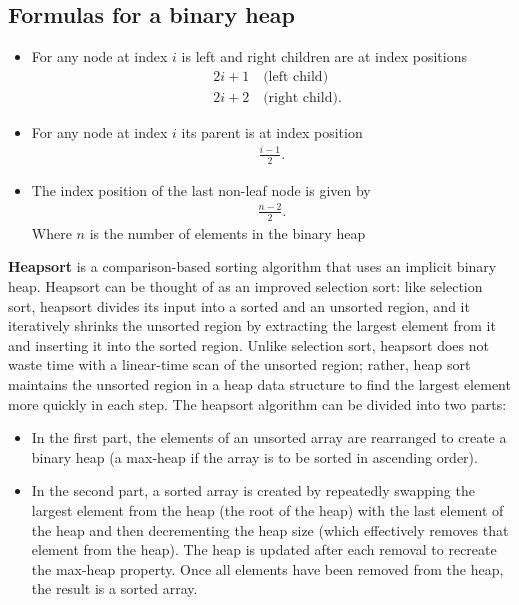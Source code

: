 \documentclass{report}
\begin{document}
    \subsection{Formulas for a binary heap}
    \begin{itemize}
        \item For any node at index $i$ is left and right children are at index positions
            \begin{align*}
                &2i + 1 \quad \text{(left child)} \\
                &2i+2 \quad \text{(right child)}
            .\end{align*}
        \item For any node at index $i$ its parent is at index position
            \begin{align*}
                \frac{i-1}{2}
            .\end{align*}
        \item The index position of the last non-leaf node is given by 
            \begin{align*}
                \frac{n-2}{2}
            .\end{align*}
            Where $n$ is the number of elements in the binary heap
    \end{itemize}

    \pagebreak 
    \bigbreak \noindent 
    \begin{concept}
        \textbf{Heapsort} is a comparison-based sorting algorithm that uses an implicit binary heap. Heapsort can be thought of as an improved selection sort: like selection sort, heapsort divides its input into a sorted and an unsorted region, and it iteratively shrinks the unsorted region by extracting the largest element from it and inserting it into the sorted region. Unlike selection sort, heapsort does not waste time with a linear-time scan of the unsorted region; rather, heap sort maintains the unsorted region in a heap data structure to find the largest element more quickly in each step.
        \bigbreak \noindent 
        The heapsort algorithm can be divided into two parts:
        \begin{itemize}
            \item In the first part, the elements of an unsorted array are rearranged to create a binary heap (a max-heap if the array is to be sorted in ascending order).
            \item In the second part, a sorted array is created by repeatedly swapping the largest element from the heap (the root of the heap) with the last element of the heap and then decrementing the heap size (which effectively removes that element from the heap). The heap is updated after each removal to recreate the max-heap property. Once all elements have been removed from the heap, the result is a sorted array.
        \end{itemize}
    \end{concept}
    \bigbreak \noindent 
\end{document}
